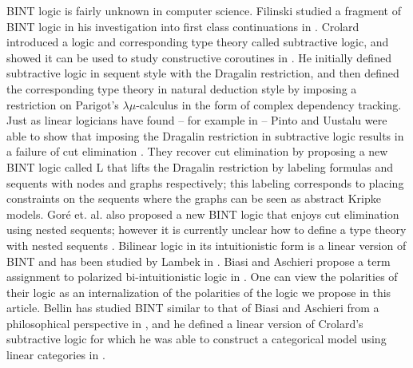 BINT logic is fairly unknown in computer science.  Filinski studied a
fragment of BINT logic in his investigation into first class
continuations in \cite{Filinski:1989}.  Crolard introduced a logic and
corresponding type theory called subtractive logic, and showed it can
be used to study constructive coroutines in
\cite{crolard01,Crolard:2004}.  He initially defined subtractive logic
in sequent style with the Dragalin restriction, and then defined the
corresponding type theory in natural deduction style by imposing a
restriction on Parigot's $\lambda\mu$-calculus in the form of complex
dependency tracking.  Just as linear logicians have found -- for
example in \cite{Schellinx:1991} -- Pinto and Uustalu were able to
show that imposing the Dragalin restriction in subtractive logic
results in a failure of cut elimination \cite{Pinto:2009}.  They
recover cut elimination by proposing a new BINT logic called L that
lifts the Dragalin restriction by labeling formulas and sequents with
nodes and graphs respectively; this labeling corresponds to placing
constraints on the sequents where the graphs can be seen as abstract
Kripke models. Gor\'e et. al. also proposed a new BINT logic that
enjoys cut elimination using nested sequents; however it is currently
unclear how to define a type theory with nested sequents
\cite{DBLP:conf/aiml/GorePT08}.  Bilinear logic in its intuitionistic
form is a linear version of BINT and has been studied by Lambek in
\cite{Lambek:1993,Lambek:1995}.  Biasi and Aschieri propose a term
assignment to polarized bi-intuitionistic logic in
\cite{Biasi:2008:TAP:2365856.2365859}.  One can view the polarities of
their logic as an internalization of the polarities of the logic we
propose in this article. Bellin has studied BINT similar to that of
Biasi and Aschieri from a philosophical perspective in
\cite{Bellin:2004,Bellin:2005,Bellin:2014}, and he defined a linear
version of Crolard's subtractive logic for which he was able to
construct a categorical model using linear categories in
\cite{Bellin:2012}.

